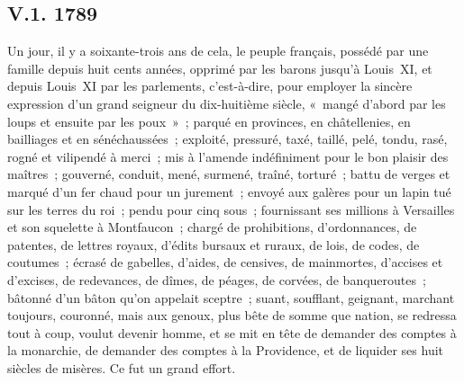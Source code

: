 \documentclass[french,twoside]{book} %
\begin{document}
\subsection[{V.1. 1789}]{V.1. 1789}
\noindent Un jour, il y a soixante-trois ans de cela, le peuple français, possédé par une famille depuis huit cents années, opprimé par les barons jusqu’à Louis XI, et depuis Louis XI par les parlements, c’est-à-dire, pour employer la sincère expression d’un grand seigneur du dix-huitième siècle, « mangé d’abord par les loups et ensuite par les poux » ; parqué en provinces, en châtellenies, en bailliages et en sénéchaussées ; exploité, pressuré, taxé, taillé, pelé, tondu, rasé, rogné et vilipendé à merci ; mis à l’amende indéfiniment pour le bon plaisir des maîtres ; gouverné, conduit, mené, surmené, traîné, torturé ; battu de verges et marqué d’un fer chaud pour un jurement ; envoyé aux galères pour un lapin tué sur les terres du roi ; pendu pour cinq sous ; fournissant ses millions à Versailles et son squelette à Montfaucon ; chargé de prohibitions, d’ordonnances, de patentes, de lettres royaux, d’édits bursaux et ruraux, de lois, de codes, de coutumes ; écrasé de gabelles, d’aides, de censives, de mainmortes, d’accises et d’excises, de redevances, de dîmes, de péages, de corvées, de banqueroutes ; bâtonné d’un bâton qu’on appelait sceptre ; suant, soufflant, geignant, marchant toujours, couronné, mais aux genoux, plus bête de somme que nation, se redressa tout à coup, voulut devenir homme, et se mit en tête de demander des comptes à la monarchie, de demander des comptes à la Providence, et de liquider ses huit siècles de misères. Ce fut un grand effort.
\end{document}
